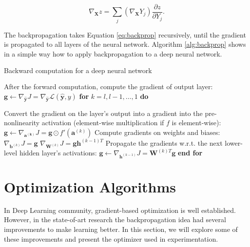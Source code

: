 \begin{equation}
\nabla_{\textbf{X}}z = \sum_{j}(\nabla_\textbf{X}Y_{j})  \frac{\partial{z}}{\partial{Y_{j}}}.
\label{eq:backprop}
\end{equation}

The backpropagation takes Equation \ref{eq:backprop} recursively, until the gradient is propagated to all layers of the neural network. Algorithm \ref{alg:backprop} \cite{Goodfellow-et-al-2016} shows in a simple way how to apply backpropagation to a deep neural network.

\begin{algorithm}[!htbp]
	\caption{Backward computation for a deep neural network}
	\begin{algorithmic} 
		\STATE After the forward computation, compute the gradient of output layer:
		\STATE $\boldsymbol{g} \leftarrow \nabla_{\boldsymbol{\hat{y}}}J = \nabla_{\boldsymbol{\hat{y}}}\mathcal{L}(\boldsymbol{\hat{y}},y)$
		\STATE \textbf{for} $k = l, l - 1,
		 \dots, 1$ \textbf{do}
		
		\STATE \hspace{5mm} Convert the gradient on the layer’s output into a gradient into the pre-nonlinearity activation (element-wise multiplication if $f$ is element-wise):
		\STATE \hspace{5mm} $\boldsymbol{g} \leftarrow \nabla_{\boldsymbol{a^{(k)}}}J = \boldsymbol{g} \odot f'(\boldsymbol{a}^{(k)})$
		\STATE \hspace{5mm} Compute gradients on weights and biases:
		\STATE \hspace{5mm} $\nabla_{\boldsymbol{b}^{(k)}}J = \boldsymbol{g}$
		\STATE \hspace{5mm} $\nabla_{\boldsymbol{W}^{(k)}}J = \boldsymbol{g} \boldsymbol{h}^{(k-1)T}$
		\STATE \hspace{5mm} Propagate the gradients w.r.t. the next lower-level hidden layer’s activations:		
		\STATE \hspace{5mm} $\boldsymbol{g} \leftarrow \nabla_{\boldsymbol{h}^{(k - 1)}}J = \boldsymbol{W}^{(k)T}\boldsymbol{g}$
		\STATE \textbf{end for}
	\end{algorithmic}
	\label{alg:backprop}
\end{algorithm}

\section{Optimization Algorithms}
In Deep Learning community, gradient-based optimization is well established. However, in the state-of-art research the backpropagation idea had several improvements to make learning better. In this section, we will explore some of these improvements and present the optimizer used in experimentation.

